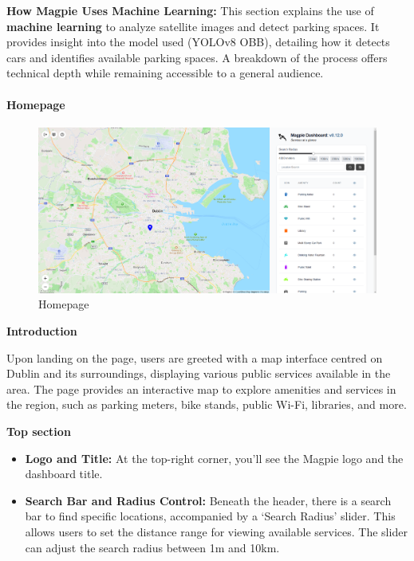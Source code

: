 \textbf{How Magpie Uses Machine Learning:} This section explains the use of \textbf{machine learning} to analyze satellite images and detect parking spaces. It provides insight into the model used (YOLOv8 OBB), detailing how it detects cars and identifies available parking spaces. A breakdown of the process offers technical depth while remaining accessible to a general audience.


\paragraph{Homepage}\mbox{}

\begin{figure}[h]
    \centering{}
    \includegraphics[width=1\textwidth]{images/site/home/homepage_1.png}
    \caption{Homepage}
\end{figure}



\textbf{Introduction}

Upon landing on the page, users are greeted with a map interface centred on Dublin and its surroundings, displaying various public services available in the area. The page provides an interactive map to explore amenities and services in the region, such as parking meters, bike stands, public Wi{-}Fi, libraries, and more.

\textbf{Top section}

\begin{itemize}
    \item{} \textbf{Logo and Title:} At the top{-}right corner, you’ll see the Magpie logo and the dashboard title.
    \item{} \textbf{Search Bar and Radius Control:} Beneath the header, there is a search bar to find specific locations, accompanied by a `Search Radius' slider. This allows users to set the distance range for viewing available services. The slider can adjust the search radius between 1m and 10km.
\end{itemize}

